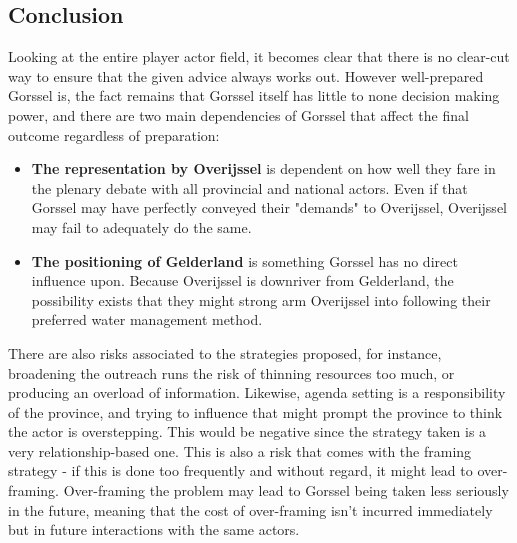 \subsection{Conclusion}

Looking at the entire player actor field, it becomes clear that there is no clear-cut way to ensure that the given advice always works out. However well-prepared Gorssel is, the fact remains that Gorssel itself has little to none decision making power, and there are two main dependencies of Gorssel that affect the final outcome regardless of preparation: 
\begin{itemize}
    \item \textbf{The representation by Overijssel} is dependent on how well they fare in the plenary debate with all provincial and national actors. Even if that Gorssel may have perfectly conveyed their "demands" to Overijssel, Overijssel may fail to adequately do the same. 
    \item \textbf{The positioning of Gelderland} is something Gorssel has no direct influence upon. Because Overijssel is downriver from Gelderland, the possibility exists that they might strong arm Overijssel into following their preferred water management method. 
\end{itemize}

There are also risks associated to the strategies proposed, for instance, broadening the outreach runs the risk of thinning resources too much, or producing an overload of information. Likewise, agenda setting is a responsibility of the province, and trying to influence that might prompt the province to think the actor is overstepping. This would be negative since the strategy taken is a very relationship-based one. This is also a risk that comes with the framing strategy - if this is done too frequently and without regard, it might lead to over-framing. Over-framing the problem may lead to Gorssel being taken less seriously in the future, meaning that the cost of over-framing isn't incurred immediately but in future interactions with the same actors.

